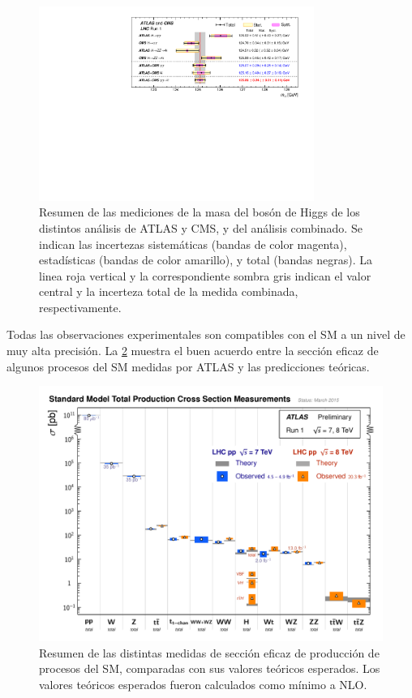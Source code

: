 \begin{figure}[!htbp]
  \centering \includegraphics[width=0.8\textwidth]{figures/higgs_atlas_cms_mass}
  \caption{Resumen de las mediciones de la masa del bosón de Higgs de los
    distintos análisis de ATLAS y CMS, y del análisis combinado. Se indican las
    incertezas sistemáticas (bandas de color magenta), estadísticas (bandas de
    color amarillo), y total (bandas negras). La linea roja vertical y la
    correspondiente sombra gris indican el valor central y la incerteza total de
    la medida combinada, respectivamente\cite{HiggsMass_ATLAS_CMS}.}
  \label{fig:higgs_cms_atlas}
\end{figure}

Todas las observaciones experimentales son compatibles con el SM a un nivel de
muy alta precisión. La \cref{fig:sm_atlas_xs} muestra el buen acuerdo entre la
sección eficaz de algunos procesos del SM medidas por ATLAS y las predicciones
teóricas.

\begin{figure}[!htbp]
  \centering
  \includegraphics[width=1\textwidth]{figures/ATLAS_a_SMSummary_TotalXsect.pdf}
  \caption{Resumen de las distintas medidas de sección eficaz de producción de
    procesos del SM, comparadas con sus valores teóricos esperados.
    Los valores teóricos esperados fueron calculados como mínimo a NLO\cite{ATLASSM}.}
  \label{fig:sm_atlas_xs}
\end{figure}


